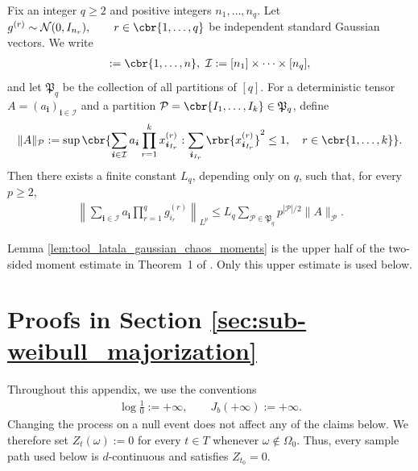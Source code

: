 \documentclass[11pt]{article}
\begin{document}
\begin{lemma}
\label{lem:tool_latala_gaussian_chaos_moments}
Fix an integer $q\ge2$ and positive integers
$n_1,\ldots,n_q$. Let $g^{(r)}
\sim
\mathcal N(0,I_{n_r}),
\qquad r\in\cbr{1,\ldots,q}$ be independent standard Gaussian vectors. We write
\begin{align*}
[n]
:=
\cbr{1,\ldots,n},
\ 
\mathcal I
:=
[n_1]\times\cdots\times[n_q],
\end{align*}
and let $\mathfrak P_q$ be the collection of all partitions of $[q]$.
For a deterministic tensor
$A=(a_{\boldsymbol i})_{\boldsymbol i\in\mathcal I}$ and a partition
$\mathcal P=\cbr{I_1,\ldots,I_k}\in\mathfrak P_q$, define
\begin{align*}
\|A\|_{\mathcal P}
:=
\sup\cbr{
\sum_{\boldsymbol i\in\mathcal I}
a_{\boldsymbol i}
\prod_{r=1}^k
x^{(r)}_{\boldsymbol i_{I_r}}:
\sum_{\boldsymbol i_{I_r}}
\rbr{x^{(r)}_{\boldsymbol i_{I_r}}}^2
\le1,
\quad r\in\cbr{1,\ldots,k}
}.
\end{align*}
Then there exists a finite constant $L_q$, depending only on $q$, such
that, for every $p\ge2$,
\begin{align}
\left\|
\sum_{\boldsymbol i\in\mathcal I}
a_{\boldsymbol i}
\prod_{r=1}^qg^{(r)}_{i_r}
\right\|_{L^p}
\le
L_q
\sum_{\mathcal P\in\mathfrak P_q}
p^{|\mathcal P|/2}\|A\|_{\mathcal P}.
\label{eq:tool_latala_gaussian_chaos_moments}
\end{align}
\end{lemma}

Lemma \ref{lem:tool_latala_gaussian_chaos_moments} is the upper half of
the two-sided moment estimate in Theorem~1 of
\citet{latala2006estimates}. Only this upper estimate is used below.







\iffalse
\section{Proofs in Section \ref{sec:sub-weibull_majorization}}\label{app:proofs_sub-weibull}

Throughout this appendix, we use the conventions
\begin{align*}
\log\frac{1}{0}:=+\infty,
\qquad
J_b(+\infty):=+\infty.
\end{align*}
Changing the process on a null event does not affect any of the claims
below. We therefore set $Z_t(\omega):=0$ for every $t\in T$ whenever
$\omega\notin\Omega_0$. Thus, every sample path used below is
$d$-continuous and satisfies $Z_{t_0}=0$.
\end{document}
